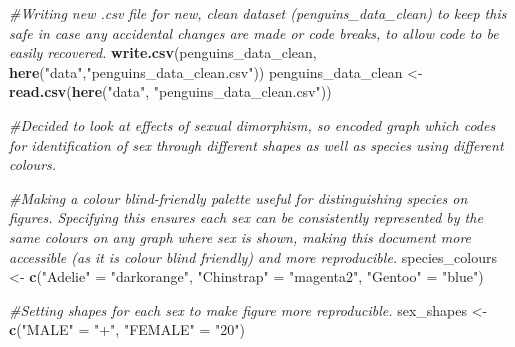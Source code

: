 \documentclass[
]{article}
\newenvironment{Shaded}{\begin{snugshade}}{\end{snugshade}}
\newcommand{\CommentTok}[1]{\textcolor[rgb]{0.56,0.35,0.01}{\textit{#1}}}
\newcommand{\FunctionTok}[1]{\textcolor[rgb]{0.13,0.29,0.53}{\textbf{#1}}}
\newcommand{\NormalTok}[1]{#1}
\newcommand{\OtherTok}[1]{\textcolor[rgb]{0.56,0.35,0.01}{#1}}
\newcommand{\StringTok}[1]{\textcolor[rgb]{0.31,0.60,0.02}{#1}}
\begin{document}
\begin{Shaded}
\begin{Highlighting}[]
\CommentTok{\#Writing new .csv file for new, clean dataset (penguins\_data\_clean) to keep this safe in case any accidental changes are made or code breaks, to allow code to be easily recovered. }
\FunctionTok{write.csv}\NormalTok{(penguins\_data\_clean, }\FunctionTok{here}\NormalTok{(}\StringTok{"data"}\NormalTok{,}\StringTok{"penguins\_data\_clean.csv"}\NormalTok{))}
\NormalTok{penguins\_data\_clean }\OtherTok{\textless{}{-}} \FunctionTok{read.csv}\NormalTok{(}\FunctionTok{here}\NormalTok{(}\StringTok{"data"}\NormalTok{, }\StringTok{"penguins\_data\_clean.csv"}\NormalTok{))}
\end{Highlighting}
\end{Shaded}

\begin{Shaded}
\begin{Highlighting}[]
\CommentTok{\#Decided to look at effects of sexual dimorphism, so encoded graph which codes for identification of sex through different shapes as well as species using different colours.}

\CommentTok{\#Making a colour blind{-}friendly palette useful for distinguishing species on figures. Specifying this ensures each sex can be consistently represented by the same colours on any graph where sex is shown, making this document more accessible (as it is colour blind friendly) and more reproducible.}
\NormalTok{species\_colours }\OtherTok{\textless{}{-}} \FunctionTok{c}\NormalTok{(}\StringTok{"Adelie"} \OtherTok{=} \StringTok{"darkorange"}\NormalTok{, }\StringTok{"Chinstrap"} \OtherTok{=} \StringTok{"magenta2"}\NormalTok{, }\StringTok{"Gentoo"} \OtherTok{=} \StringTok{"blue"}\NormalTok{)}

\CommentTok{\#Setting shapes for each sex to make figure more reproducible.}
\NormalTok{sex\_shapes }\OtherTok{\textless{}{-}} \FunctionTok{c}\NormalTok{(}\StringTok{"MALE"} \OtherTok{=} \StringTok{"+"}\NormalTok{, }\StringTok{"FEMALE"} \OtherTok{=} \StringTok{"20"}\NormalTok{)}


\end{Highlighting}
\end{Shaded}
\end{document}
